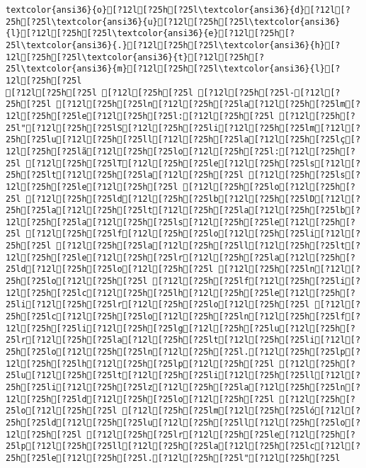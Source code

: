 \documentclass{scrartcl}
\begin{document}
\begin{Verbatim}
textcolor{ansi36}{o}[?12l[?25h[?25l\textcolor{ansi36}{d}[?12l[?25h[?25l\textcolor{ansi36}{u}[?12l[?25h[?25l\textcolor{ansi36}{l}[?12l[?25h[?25l\textcolor{ansi36}{e}[?12l[?25h[?25l\textcolor{ansi36}{.}[?12l[?25h[?25l\textcolor{ansi36}{h}[?12l[?25h[?25l\textcolor{ansi36}{t}[?12l[?25h[?25l\textcolor{ansi36}{m}[?12l[?25h[?25l\textcolor{ansi36}{l}[?12l[?25h[?25l
[?12l[?25h[?25l [?12l[?25h[?25l [?12l[?25h[?25l-[?12l[?25h[?25l [?12l[?25h[?25ln[?12l[?25h[?25la[?12l[?25h[?25lm[?12l[?25h[?25le[?12l[?25h[?25l:[?12l[?25h[?25l [?12l[?25h[?25l"[?12l[?25h[?25lS[?12l[?25h[?25li[?12l[?25h[?25lm[?12l[?25h[?25lu[?12l[?25h[?25ll[?12l[?25h[?25la[?12l[?25h[?25lç[?12l[?25h[?25lã[?12l[?25h[?25lo[?12l[?25h[?25l:[?12l[?25h[?25l [?12l[?25h[?25lT[?12l[?25h[?25le[?12l[?25h[?25ls[?12l[?25h[?25lt[?12l[?25h[?25la[?12l[?25h[?25l [?12l[?25h[?25ls[?12l[?25h[?25le[?12l[?25h[?25l [?12l[?25h[?25lo[?12l[?25h[?25l [?12l[?25h[?25ld[?12l[?25h[?25lb[?12l[?25h[?25lD[?12l[?25h[?25la[?12l[?25h[?25lt[?12l[?25h[?25la[?12l[?25h[?25lb[?12l[?25h[?25la[?12l[?25h[?25ls[?12l[?25h[?25le[?12l[?25h[?25l [?12l[?25h[?25lf[?12l[?25h[?25lo[?12l[?25h[?25li[?12l[?25h[?25l [?12l[?25h[?25la[?12l[?25h[?25ll[?12l[?25h[?25lt[?12l[?25h[?25le[?12l[?25h[?25lr[?12l[?25h[?25la[?12l[?25h[?25ld[?12l[?25h[?25lo[?12l[?25h[?25l [?12l[?25h[?25ln[?12l[?25h[?25lo[?12l[?25h[?25l [?12l[?25h[?25lf[?12l[?25h[?25li[?12l[?25h[?25lc[?12l[?25h[?25lh[?12l[?25h[?25le[?12l[?25h[?25li[?12l[?25h[?25lr[?12l[?25h[?25lo[?12l[?25h[?25l [?12l[?25h[?25lc[?12l[?25h[?25lo[?12l[?25h[?25ln[?12l[?25h[?25lf[?12l[?25h[?25li[?12l[?25h[?25lg[?12l[?25h[?25lu[?12l[?25h[?25lr[?12l[?25h[?25la[?12l[?25h[?25lt[?12l[?25h[?25li[?12l[?25h[?25lo[?12l[?25h[?25ln[?12l[?25h[?25l.[?12l[?25h[?25lp[?12l[?25h[?25lh[?12l[?25h[?25lp[?12l[?25h[?25l [?12l[?25h[?25lu[?12l[?25h[?25lt[?12l[?25h[?25li[?12l[?25h[?25ll[?12l[?25h[?25li[?12l[?25h[?25lz[?12l[?25h[?25la[?12l[?25h[?25ln[?12l[?25h[?25ld[?12l[?25h[?25lo[?12l[?25h[?25l [?12l[?25h[?25lo[?12l[?25h[?25l [?12l[?25h[?25lm[?12l[?25h[?25ló[?12l[?25h[?25ld[?12l[?25h[?25lu[?12l[?25h[?25ll[?12l[?25h[?25lo[?12l[?25h[?25l [?12l[?25h[?25lr[?12l[?25h[?25le[?12l[?25h[?25lp[?12l[?25h[?25ll[?12l[?25h[?25la[?12l[?25h[?25lc[?12l[?25h[?25le[?12l[?25h[?25l.[?12l[?25h[?25l"[?12l[?25h[?25l

\end{Verbatim}
\end{document}
